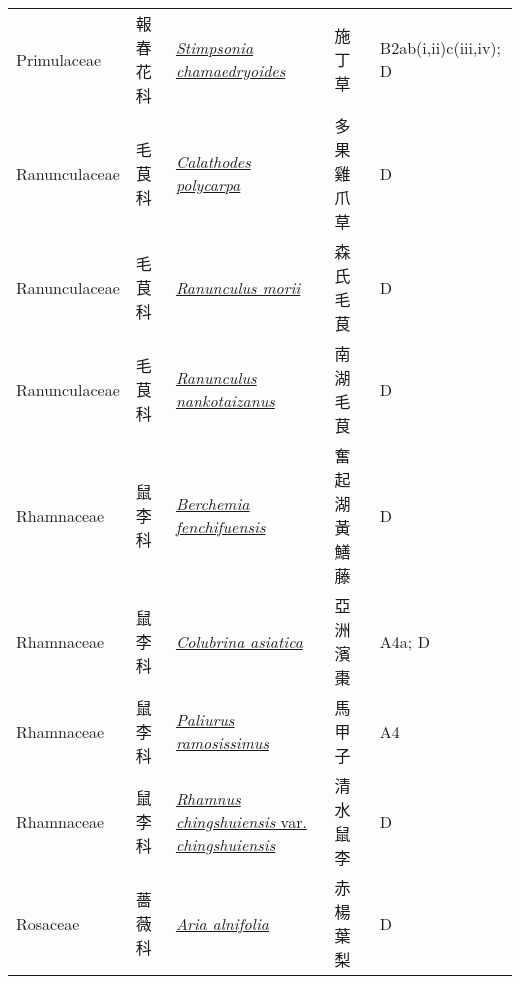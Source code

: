 {\begin{longtable}{p{2.5cm}p{2.5cm}p{4.5cm}p{2.5cm}p{3cm}}
    Primulaceae & 報春花科 & \href{http://www.theplantlist.org/tpl1.1/search?q=Stimpsonia+chamaedryoides}{\textit{Stimpsonia chamaedryoides} } & 施丁草 & B2ab(i,ii)c(iii,iv); D \index{Stimpsonia@\textit{Stimpsonia}!chamaedryoides@\textit{chamaedryoides}}  \index{施丁草} \\
    Ranunculaceae & 毛茛科 & \href{http://www.theplantlist.org/tpl1.1/search?q=Calathodes+polycarpa}{\textit{Calathodes polycarpa} } & 多果雞爪草 & D \index{Calathodes@\textit{Calathodes}!polycarpa@\textit{polycarpa}}  \index{多果雞爪草} \\
    Ranunculaceae & 毛茛科 & \href{http://www.theplantlist.org/tpl1.1/search?q=Ranunculus+morii}{\textit{Ranunculus morii} } & 森氏毛茛 & D \index{Ranunculus@\textit{Ranunculus}!morii@\textit{morii}}  \index{森氏毛茛} \\
    Ranunculaceae & 毛茛科 & \href{http://www.theplantlist.org/tpl1.1/search?q=Ranunculus+nankotaizanus}{\textit{Ranunculus nankotaizanus} } & 南湖毛茛 & D \index{Ranunculus@\textit{Ranunculus}!nankotaizanus@\textit{nankotaizanus}}  \index{南湖毛茛} \\
    Rhamnaceae & 鼠李科 & \href{http://www.theplantlist.org/tpl1.1/search?q=Berchemia+fenchifuensis}{\textit{Berchemia fenchifuensis} } & 奮起湖黃鱔藤 & D \index{Berchemia@\textit{Berchemia}!fenchifuensis@\textit{fenchifuensis}}  \index{奮起湖黃鱔藤} \\
    Rhamnaceae & 鼠李科 & \href{http://www.theplantlist.org/tpl1.1/search?q=Colubrina+asiatica}{\textit{Colubrina asiatica} } & 亞洲濱棗 & A4a; D \index{Colubrina@\textit{Colubrina}!asiatica@\textit{asiatica}}  \index{亞洲濱棗} \\
    Rhamnaceae & 鼠李科 & \href{http://www.theplantlist.org/tpl1.1/search?q=Paliurus+ramosissimus}{\textit{Paliurus ramosissimus} } & 馬甲子 & A4 \index{Paliurus@\textit{Paliurus}!ramosissimus@\textit{ramosissimus}}  \index{馬甲子} \\
    Rhamnaceae & 鼠李科 & \href{http://www.theplantlist.org/tpl1.1/search?q=Rhamnus+chingshuiensis+var.+chingshuiensis}{\textit{Rhamnus chingshuiensis} var. \textit{chingshuiensis} } & 清水鼠李 & D \index{Rhamnus@\textit{Rhamnus}!chingshuiensis@\textit{chingshuiensis}!var. chingshuiensis@var. \textit{chingshuiensis}}  \index{清水鼠李} \\
    Rosaceae & 薔薇科 & \href{http://www.theplantlist.org/tpl1.1/search?q=Aria+alnifolia}{\textit{Aria alnifolia} } & 赤楊葉梨 & D \index{Aria@\textit{Aria}!alnifolia@\textit{alnifolia}}  \index{赤楊葉梨} \\

\end{longtable}}
